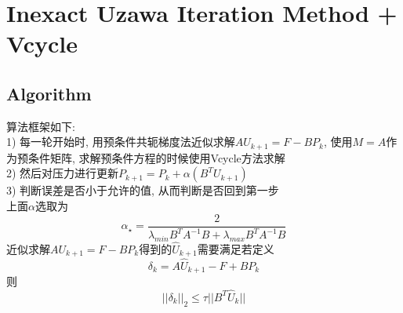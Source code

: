 \documentclass{article}
\begin{document}
\section{Inexact Uzawa Iteration Method + Vcycle}
\subsection{Algorithm}
算法框架如下:\\
1) 每一轮开始时, 用预条件共轭梯度法近似求解$AU_{k+1}=F-BP_k$, 
使用$M=A$作为预条件矩阵, 求解预条件方程的时候使用Vcycle方法求解\\
2) 然后对压力进行更新$P_{k+1}=P_k+\alpha(B^TU_{k+1})$\\
3) 判断误差是否小于允许的值, 从而判断是否回到第一步\\
上面$\alpha$选取为\\
$$
\alpha_{\star}=\frac{2}{\lambda_{min}{B^TA^{-1}B}+\lambda_{max}{B^TA^{-1}B}}
$$
近似求解$AU_{k+1}=F-BP_k$得到的$\hat{U}_{k+1}$需要满足若定义$$
\delta_k = A\hat{U}_{k+1}-F+BP_k
$$
则
$$
||\delta_k||_2 \leq \tau||B^T\hat{U}_k||
$$
\end{document}
